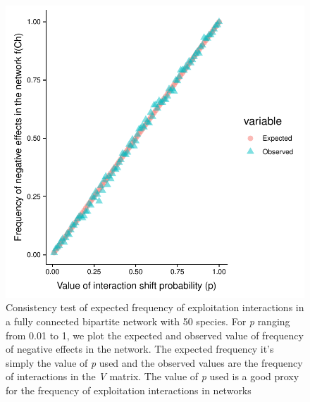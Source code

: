 \documentclass[a4paper, 12pt]{article}
\begin{document}
\begin{singlespace}
\begin{figure}[H]
 \centering
  \includegraphics[width=\linewidth]{Sup_Figura_2.pdf}
  \vspace*{-7mm}
  \caption{Consistency test of expected frequency of exploitation interactions in a fully connected bipartite network with 50 species. For \textit{p} ranging from 0.01 to 1, we plot the expected and observed value of frequency of negative effects in the network. The expected frequency it's simply the value of \textit{p} used and the observed values are the frequency of interactions in the \textit{V} matrix. The value of \textit{p} used is a good proxy for the frequency of exploitation interactions in networks}
  \label{supfig:2}
\end{figure}


\end{singlespace}
\end{document}

